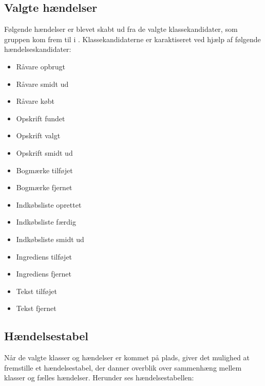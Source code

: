 \subsection{Valgte hændelser}
Følgende hændelser er blevet skabt ud fra de valgte klassekandidater, som gruppen kom frem til i . Klassekandidaterne er karaktiseret ved hjælp af følgende hændelseskandidater: 

\begin{itemize} [noitemsep]
\item Råvare opbrugt
\item Råvare smidt ud
\item Råvare købt
\item Opskrift fundet
\item Opskrift valgt
\item Opskrift smidt ud
\item Bogmærke tilføjet
\item Bogmærke fjernet
\item Indkøbsliste oprettet
\item Indkøbsliste færdig
\item Indkøbsliste smidt ud
\item Ingrediens tilføjet
\item Ingrediens fjernet
\item Tekst tilføjet
\item Tekst fjernet
\end{itemize}

\subsection{Hændelsestabel}
Når de valgte klasser og hændelser er kommet på plads, giver det mulighed at fremstille et hændelsestabel, der danner overblik over sammenhæng mellem klasser og fælles hændelser. Herunder ses hændelsestabellen:





